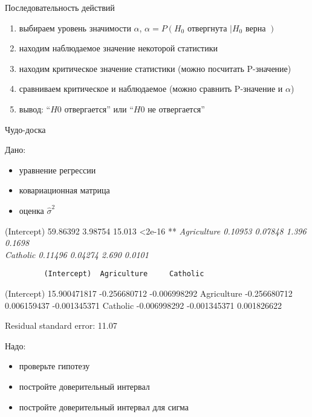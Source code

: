 \documentclass[ignorenonframetext,]{beamer}
\begin{document}
\begin{frame}{Последовательность действий}

\begin{enumerate}
\def\labelenumi{\arabic{enumi}.}
\itemsep1pt\parskip0pt
\item
  выбираем уровень значимости $\alpha$,
  $\alpha=P(H_0 \text{ отвергнута }| H_0 \text{ верна })$
\item
  находим наблюдаемое значение некоторой статистики
\item
  находим критическое значение статистики (можно посчитать P-значение)
\item
  сравниваем критическое и наблюдаемое (можно сравнить P-значение и
  $\alpha$)
\item
  вывод: ``$H0$ отвергается'' или ``$H0$ не отвергается''
\end{enumerate}

\end{frame}

\begin{frame}[fragile]{Чудо-доска}

Дано:

\begin{itemize}
\itemsep1pt\parskip0pt
\item
  уравнение регрессии
\item
  ковариационная матрица
\item
  оценка $\hat{\sigma}^2$
\end{itemize}

(Intercept) 59.86392 3.98754 15.013 \textless{}2e-16 **\emph{
Agriculture 0.10953 0.07848 1.396 0.1698\\Catholic 0.11496 0.04274 2.690
0.0101 }

\begin{verbatim}
         (Intercept)  Agriculture     Catholic
\end{verbatim}

(Intercept) 15.900471817 -0.256680712 -0.006998292 Agriculture
-0.256680712 0.006159437 -0.001345371 Catholic -0.006998292 -0.001345371
0.001826622

Residual standard error: 11.07

Надо:

\begin{itemize}
\itemsep1pt\parskip0pt
\item
  проверьте гипотезу
\item
  постройте доверительный интервал
\item
  постройте доверительный интервал для сигма
\end{itemize}

\end{frame}
\end{document}
